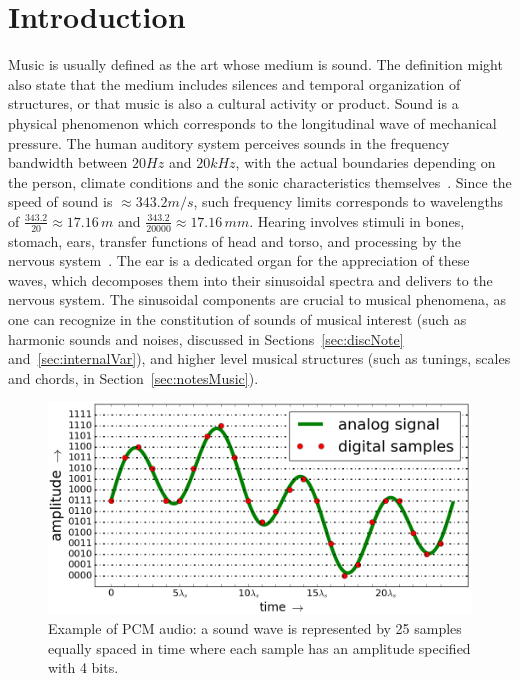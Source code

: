 \section{Introduction}\label{sec:level1}
Music is usually defined as the art whose medium is sound.
The definition might also state that the medium includes silences
and temporal organization of structures, or that music
is also a cultural activity or product.
Sound is a physical phenomenon which corresponds to the longitudinal wave of mechanical pressure.
The human auditory system perceives sounds in the frequency bandwidth between $20Hz$ and $20kHz$,
with the actual boundaries depending on the person,
climate conditions and the sonic characteristics themselves~\cite{Roederer}.
Since the speed of sound is $\approx 343.2 m/s$,
such frequency limits corresponds to  wavelengths of $\frac{343.2}{20} \approx 17.16\,m$ and
$\frac{343.2}{20000} \approx 17.16\,mm$.
Hearing involves stimuli in bones, stomach, ears,
transfer functions of head and torso,
and processing by the nervous system~\cite{Roederer}.
The ear is a dedicated organ for the appreciation of these waves,
which decomposes them into their sinusoidal spectra and delivers to the nervous system.
The sinusoidal components are crucial to musical phenomena,
as one can recognize in the constitution of sounds of musical interest
(such as harmonic sounds and noises, discussed in Sections~\ref{sec:discNote} and~\ref{sec:internalVar}),
and higher level musical structures (such as tunings, scales and chords, in Section~\ref{sec:notesMusic}).

\begin{figure}[!h]
    \centering
        \includegraphics[width=.7\textwidth]{figures/pcm_}
	\caption{Example of PCM audio:
	a sound wave is represented by 25 samples equally spaced in time where each sample has an amplitude specified with 4 bits.}
        \label{fig:PCM}
\end{figure}

